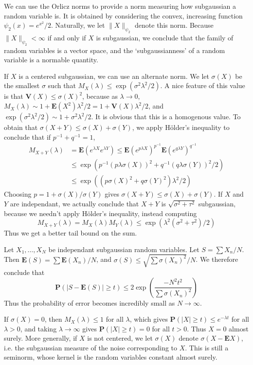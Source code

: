We can use the Orlicz norms to provide a norm measuring how subgaussian a random variable is. It is obtained by considering the convex, increasing function $\psi_2(x) = e^{x^2}/2$. Naturally, we let $\| X \|_{\psi_2}$ denote this norm. Because $\| X \|_{\psi_2} < \infty$ if and only if $X$ is subgaussian, we conclude that the family of random variables is a vector space, and the `subgaussianness' of a random variable is a normable quantity.

If $X$ is a centered subgaussian, we can use an alternate norm. We let $\sigma(X)$ be the smallest $\sigma$ such that $M_X(\lambda) \leq \exp(\sigma^2 \lambda^2/2)$. A nice feature of this value is that $\mathbf{V}(X) \leq \sigma(X)^2$, because as $\lambda \to 0$, $M_X(\lambda) \sim 1 + \mathbf{E}(X^2) \lambda^2 /2 = 1 + \mathbf{V}(X) \lambda^2/2$, and $\exp(\sigma^2 \lambda^2/2) \sim 1 + \sigma^2 \lambda^2 / 2$. It is obvious that this is a homogenous value. To obtain that $\sigma(X+Y) \leq \sigma(X) + \sigma(Y)$, we apply H\"{o}lder's inequality to conclude that if $p^{-1} + q^{-1} = 1$,
%
\begin{align*}
    M_{X+Y}(\lambda) &= \mathbf{E}(e^{\lambda X} e^{\lambda Y}) \leq \mathbf{E}(e^{p \lambda X})^{p^{-1}} \mathbf{E}(e^{q \lambda Y})^{q^{-1}}\\
    &\leq \exp(p^{-1} (p \lambda \sigma(X))^2 + q^{-1} (q \lambda \sigma(Y))^2/2)\\
    &\leq \exp((p \sigma(X)^2 + q \sigma(Y)^2) \lambda^2/2)
\end{align*}
%
Choosing $p = 1 + \sigma(X)/\sigma(Y)$ gives $\sigma(X+Y) \leq \sigma(X) + \sigma(Y)$. If $X$ and $Y$ are independant, we actually conclude that $X + Y$ is $\sqrt{\sigma^2 + \tau^2}$ subgaussian, because we needn't apply H\"{o}lder's inequality, instead computing
%
\[ M_{X+Y}(\lambda) = M_X(\lambda) M_Y(\lambda) \leq \exp(\lambda^2 (\sigma^2 + \tau^2)/2) \]
%
Thus we get a better tail bound on the sum.

\begin{example}
    Let $X_1, \dots, X_N$ be independant subgaussian random variables. Let $S = \sum X_n/N$. Then $\mathbf{E}(S) = \sum \mathbf{E}(X_n) / N$, and $\sigma(S) \leq \sqrt{\sum \sigma(X_n)^2} / N$. We therefore conclude that
    \[ \mathbf{P}(|S - \mathbf{E}(S)| \geq t) \leq 2 \exp \left( \frac{- N^2 t^2}{\sum \sigma(X_n)^2} \right) \]
    Thus the probability of error becomes incredibly small as $N \to \infty$.
\end{example}

If $\sigma(X) = 0$, then $M_X(\lambda) \leq 1$ for all $\lambda$, which gives $\mathbf{P}(|X| \geq t) \leq e^{-\lambda t}$ for all $\lambda > 0$, and taking $\lambda \to \infty$ gives $\mathbf{P}(|X| \geq t) = 0$ for all $t > 0$. Thus $X = 0$ almost surely. More generally, if $X$ is not centered, we let $\sigma(X)$ denote $\sigma(X - \mathbf{E} X)$, i.e. the subgaussian measure of the noise corresponding to $X$. This is still a seminorm, whose kernel is the random variables constant almost surely.

